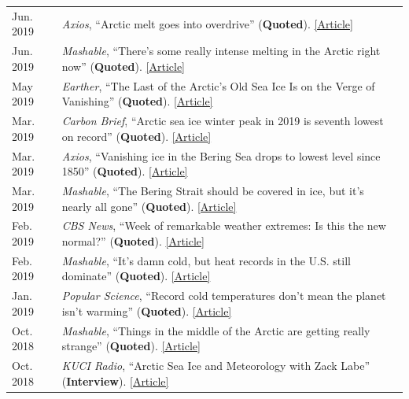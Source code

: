 \documentclass[margin,line,palatino,courier,10pt]{res}
\begin{document}
\begin{resume}
\begin{tabular}{@{}p{0.9in}p{4in}}
Jun. 2019 & \textit{Axios}, ``Arctic melt goes into overdrive'' (\textbf{Quoted}). \href{https://www.axios.com/newsletters/axios-science-9172185b-a9a1-498f-9014-4ee04e1ff826.html?chunk=3#story3}{[Article]}\\
Jun. 2019 & \textit{Mashable}, ``There's some really intense melting in the Arctic right now'' (\textbf{Quoted}). \href{https://mashable.com/article/arctic-melting-records/}{[Article]}\\
May 2019 & \textit{Earther}, ``The Last of the Arctic's Old Sea Ice Is on the Verge of Vanishing'' (\textbf{Quoted}). \href{https://earther.gizmodo.com/the-last-of-the-arctics-old-sea-ice-is-on-the-verge-of-1834510753}{[Article]}\\
Mar. 2019 & \textit{Carbon Brief}, ``Arctic sea ice winter peak in 2019 is seventh lowest on record'' (\textbf{Quoted}). \href{https://www.carbonbrief.org/arctic-sea-ice-winter-peak-in-2019-is-seventh-lowest-on-record}{[Article]}\\
Mar. 2019 & \textit{Axios}, ``Vanishing ice in the Bering Sea drops to lowest level since 1850'' (\textbf{Quoted}). \href{https://www.axios.com/bering-sea-ice-vanishing-a23bacda-a08d-4ec7-9124-419b90b984a2.html}{[Article]}\\
Mar. 2019 &\textit{Mashable}, ``The Bering Strait should be covered in ice, but it's nearly all gone'' (\textbf{Quoted}). \href{https://mashable.com/article/bering-strait-sea-ice-gone-2019-arctic/#zs3hdvbg3mqc}{[Article]}\\
Feb. 2019 & \textit{CBS News}, ``Week of remarkable weather extremes: Is this the new normal?'' (\textbf{Quoted}). \href{https://www.cbsnews.com/news/remarkable-weather-extremes-is-this-the-new-normal-climate-change/?ftag=CNM-00-10aab7e&linkId=64169123}{[Article]}\\
Feb. 2019 & \textit{Mashable}, ``It's damn cold, but heat records in the U.S. still dominate'' (\textbf{Quoted}). \href{https://mashable.com/article/polar-vortex-climate-change-cold-record/#xQmvXhcFJPqH}{[Article]}\\
Jan. 2019 & \textit{Popular Science}, ``Record cold temperatures don't mean the planet isn't warming'' (\textbf{Quoted}). \href{https://www.popsci.com/cold-weather-climate-change}{[Article]}\\
Oct. 2018 & \textit{Mashable}, ``Things in the middle of the Arctic are getting really strange'' (\textbf{Quoted}). \href{https://mashable.com/article/low-arctic-ice-central-basin/#xQmvXhcFJPqH}{[Article]}\\
Oct. 2018 & \textit{KUCI Radio}, ``Arctic Sea Ice and Meteorology with Zack Labe'' (\textbf{Interview}). \href{https://thesciencespiel.org/2018/10/08/october-8-2018-arctic-sea-ice-and-meteorology-with-zack-labe/}{[Article]}\\

\end{tabular}
\end{resume}
\end{document}

